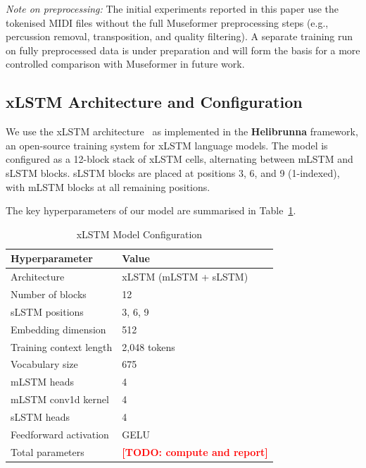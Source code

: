 \documentclass[conference]{IEEEtran}
\newcommand{\TODO}[1]{\textcolor{red}{\textbf{[TODO: #1]}}}
\begin{document}
\textit{Note on preprocessing:} The initial experiments reported in
this paper use the tokenised MIDI files without the full Museformer
preprocessing steps (e.g., percussion removal, transposition, and
quality filtering). A separate training run on fully preprocessed data
is under preparation and will form the basis for a more controlled
comparison with Museformer in future work.

\subsection{xLSTM Architecture and Configuration}
\label{ssec:model}

We use the xLSTM architecture~\cite{beck2024} as implemented in the
\textbf{Helibrunna} framework, an open-source training system for xLSTM
language models. The model is configured as a 12-block stack of xLSTM
cells, alternating between mLSTM and sLSTM blocks. sLSTM blocks are
placed at positions 3, 6, and 9 (1-indexed), with mLSTM blocks at all
remaining positions.

The key hyperparameters of our model are summarised in
Table~\ref{tab:model_config}.

\begin{table}[t]
  \caption{xLSTM Model Configuration}
  \label{tab:model_config}
  \centering
  \renewcommand{\arraystretch}{1.2}
  \begin{tabular}{@{}ll@{}}
    \toprule
    \textbf{Hyperparameter} & \textbf{Value} \\
    \midrule
    Architecture            & xLSTM (mLSTM + sLSTM) \\
    Number of blocks        & 12 \\
    sLSTM positions         & 3, 6, 9 \\
    Embedding dimension     & 512 \\
    Training context length & 2,048 tokens \\
    Vocabulary size         & 675 \\
    mLSTM heads             & 4 \\
    mLSTM conv1d kernel     & 4 \\
    sLSTM heads             & 4 \\
    Feedforward activation  & GELU \\
    Total parameters        & \TODO{compute and report} \\
    \bottomrule
  \end{tabular}
\end{table}
\end{document}
